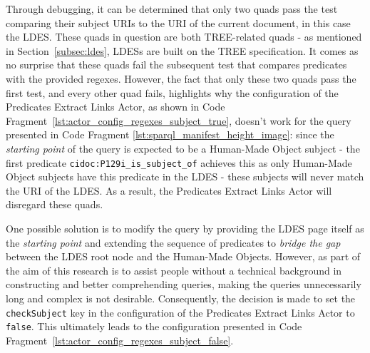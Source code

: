 Through debugging, it can be determined that only two quads pass the test comparing their subject URIs to the URI of the current document, in this case the LDES. These quads in question are both TREE-related quads - as mentioned in Section~\ref{subsec:ldes}, LDESs are built on the TREE specification. It comes as no surprise that these quads fail the subsequent test that compares predicates with the provided regexes. However, the fact that only these two quads pass the first test, and every other quad fails, highlights why the configuration of the Predicates Extract Links Actor, as shown in Code Fragment~\ref{lst:actor_config_regexes_subject_true}, doesn't work for the query presented in Code Fragment \ref{lst:sparql_manifest_height_image}: since the \textit{starting point} of the query is expected to be a Human-Made Object subject - the first predicate \texttt{cidoc:P129i_is_subject_of} achieves this as only Human-Made Object subjects have this predicate in the LDES - these subjects will never match the URI of the LDES. As a result, the Predicates Extract Links Actor will disregard these quads.

One possible solution is to modify the query by providing the LDES page itself as the \textit{starting point} and extending the sequence of predicates to \textit{ bridge the gap} between the LDES root node and the Human-Made Objects. However, as part of the aim of this research is to assist people without a technical background in constructing and better comprehending queries, making the queries unnecessarily long and complex is not desirable. Consequently, the decision is made to set the \texttt{checkSubject} key in the configuration of the Predicates Extract Links Actor to \texttt{false}. This ultimately leads to the configuration presented in Code Fragment~\ref{lst:actor_config_regexes_subject_false}.

